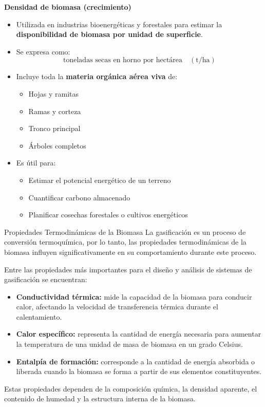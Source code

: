 \documentclass[../../main.tex]{subfiles}
\begin{document}
\begin{frame}{\textbf{Densidad de biomasa (crecimiento)}}
\begin{itemize}
  \item Utilizada en industrias bioenergéticas y forestales para estimar la \textbf{disponibilidad de biomasa por unidad de superficie}.
  \item Se expresa como:
  \[
  \text{toneladas secas en horno por hectárea} \quad (\text{t/ha})
  \]
  \item Incluye toda la \textbf{materia orgánica aérea viva} de:
  \begin{itemize}
    \item Hojas y ramitas
    \item Ramas y corteza
    \item Tronco principal
    \item Árboles completos
  \end{itemize}
  \item Es útil para:
  \begin{itemize}
    \item Estimar el potencial energético de un terreno
    \item Cuantificar carbono almacenado
    \item Planificar cosechas forestales o cultivos energéticos
  \end{itemize}
\end{itemize}
\end{frame}


\begin{frame}{Propiedades Termodinámicas de la Biomasa}
\justifying
\small
La gasificación es un proceso de conversión termoquímica, por lo tanto, las propiedades termodinámicas de la biomasa influyen significativamente en su comportamiento durante este proceso.

Entre las propiedades más importantes para el diseño y análisis de sistemas de gasificación se encuentran:

\begin{itemize}
    \item \textbf{Conductividad térmica:} mide la capacidad de la biomasa para conducir calor, afectando la velocidad de transferencia térmica durante el calentamiento.
    
    \item \textbf{Calor específico:} representa la cantidad de energía necesaria para aumentar la temperatura de una unidad de masa de biomasa en un grado Celsius.
    
    \item \textbf{Entalpía de formación:} corresponde a la cantidad de energía absorbida o liberada cuando la biomasa se forma a partir de sus elementos constituyentes.
\end{itemize}

Estas propiedades dependen de la composición química, la densidad aparente, el contenido de humedad y la estructura interna de la biomasa.


\end{frame}
\end{document}
